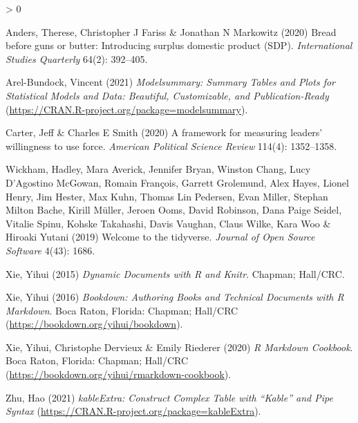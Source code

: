 \documentclass[
  11pt,
]{article}
\newlength{\cslhangindent}
\newenvironment{CSLReferences}[2] %
 {%
  \setlength{\parindent}{0pt}
  \ifodd #1 \everypar{\setlength{\hangindent}{\cslhangindent}}\ignorespaces\fi
  \ifnum #2 > 0
  \setlength{\parskip}{#2\baselineskip}
  \fi
 }%
 {}
\begin{document}
\hypertarget{refs}{}
\begin{CSLReferences}{1}{0}
\leavevmode\hypertarget{ref-andersetal2020bbgb}{}%
Anders, Therese, Christopher J Fariss \& Jonathan N Markowitz (2020) Bread before guns or butter: Introducing surplus domestic product (SDP). \emph{International Studies Quarterly} 64(2): 392--405.

\leavevmode\hypertarget{ref-arelbundock2021m}{}%
Arel-Bundock, Vincent (2021) \emph{Modelsummary: Summary Tables and Plots for Statistical Models and Data: Beautiful, Customizable, and Publication-Ready} (\url{https://CRAN.R-project.org/package=modelsummary}).

\leavevmode\hypertarget{ref-cartersmith2020fml}{}%
Carter, Jeff \& Charles E Smith (2020) A framework for measuring leaders' willingness to use force. \emph{American Political Science Review} 114(4): 1352--1358.

\leavevmode\hypertarget{ref-wickhametal2019wt}{}%
Wickham, Hadley, Mara Averick, Jennifer Bryan, Winston Chang, Lucy D'Agostino McGowan, Romain François, Garrett Grolemund, Alex Hayes, Lionel Henry, Jim Hester, Max Kuhn, Thomas Lin Pedersen, Evan Miller, Stephan Milton Bache, Kirill Müller, Jeroen Ooms, David Robinson, Dana Paige Seidel, Vitalie Spinu, Kohske Takahashi, Davis Vaughan, Claus Wilke, Kara Woo \& Hiroaki Yutani (2019) Welcome to the {tidyverse}. \emph{Journal of Open Source Software} 4(43): 1686.

\leavevmode\hypertarget{ref-xie2015ddrk}{}%
Xie, Yihui (2015) \emph{Dynamic Documents with {R} and Knitr}. Chapman; Hall/CRC.

\leavevmode\hypertarget{ref-xie2016b}{}%
Xie, Yihui (2016) \emph{Bookdown: Authoring Books and Technical Documents with {R} Markdown}. Boca Raton, Florida: Chapman; Hall/CRC (\url{https://bookdown.org/yihui/bookdown}).

\leavevmode\hypertarget{ref-xieetal2020rmc}{}%
Xie, Yihui, Christophe Dervieux \& Emily Riederer (2020) \emph{R Markdown Cookbook}. Boca Raton, Florida: Chapman; Hall/CRC (\url{https://bookdown.org/yihui/rmarkdown-cookbook}).

\leavevmode\hypertarget{ref-zhu2021k}{}%
Zhu, Hao (2021) \emph{kableExtra: Construct Complex Table with {``Kable''} and Pipe Syntax} (\url{https://CRAN.R-project.org/package=kableExtra}).

\end{CSLReferences}
\end{document}
